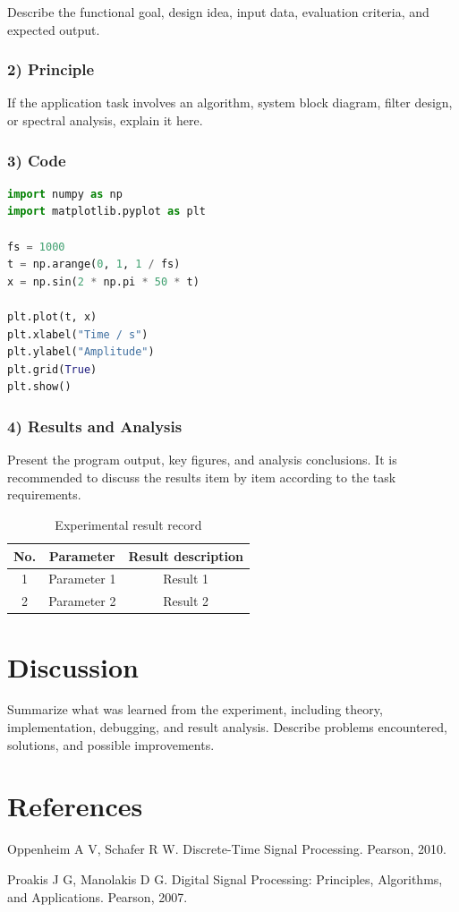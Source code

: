 \documentclass[10pt]{article}
\begin{document}
Describe the functional goal, design idea, input data, evaluation criteria, and expected output.

\subsubsection*{2) Principle}

If the application task involves an algorithm, system block diagram, filter design, or spectral analysis, explain it here.

\subsubsection*{3) Code}

\begin{lstlisting}[language=Python,caption={Python code example}]
import numpy as np
import matplotlib.pyplot as plt

fs = 1000
t = np.arange(0, 1, 1 / fs)
x = np.sin(2 * np.pi * 50 * t)

plt.plot(t, x)
plt.xlabel("Time / s")
plt.ylabel("Amplitude")
plt.grid(True)
plt.show()
\end{lstlisting}

\subsubsection*{4) Results and Analysis}

Present the program output, key figures, and analysis conclusions. It is recommended to discuss the results item by item according to the task requirements.

\begin{table}[H]
  \centering
  \caption{Experimental result record}
  \begin{tabular}{ccc}
    \toprule
    No. & Parameter & Result description \\
    \midrule
    1 & Parameter 1 & Result 1 \\
    2 & Parameter 2 & Result 2 \\
    \bottomrule
  \end{tabular}
  \label{tab:result}
\end{table}

\section{Discussion}

Summarize what was learned from the experiment, including theory, implementation, debugging, and result analysis. Describe problems encountered, solutions, and possible improvements.

\section{References}

\begin{enumerate}[label={[\arabic*]}]
  \item Oppenheim A V, Schafer R W. Discrete-Time Signal Processing. Pearson, 2010.
  \item Proakis J G, Manolakis D G. Digital Signal Processing: Principles, Algorithms, and Applications. Pearson, 2007.
\end{enumerate}
\end{document}
